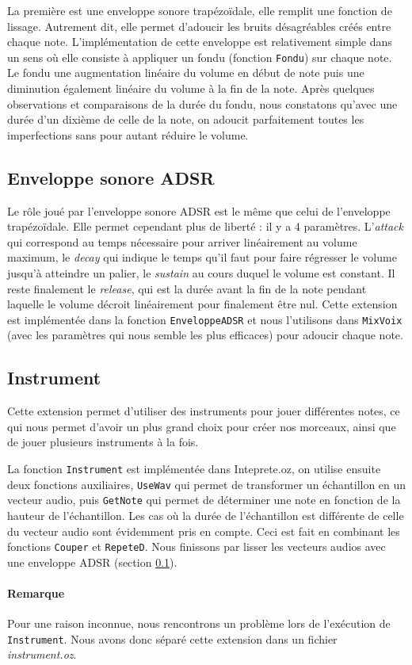 \documentclass[a4paper,oneside,10pt]{article}
\newcommand{\fun}[1]{\texttt{#1}}
\begin{document}
La première est une enveloppe sonore trapézo\"idale, elle remplit une fonction de lissage.
Autrement dit, elle permet d'adoucir les bruits désagréables créés entre chaque note.
L'implémentation de cette enveloppe est relativement simple dans 
un sens où elle consiste à appliquer un fondu (fonction \fun{Fondu}) sur chaque note. 
Le fondu une augmentation linéaire du volume en début de note puis 
une diminution également linéaire du volume à la fin de la note. 
Après quelques observations et comparaisons de la durée du fondu, 
nous constatons qu'avec une durée d'un dixième de celle de la note, 
on adoucit parfaitement toutes les imperfections sans pour autant 
réduire le volume.


\subsection{Enveloppe sonore ADSR}
\label{subsec:adsr}

Le rôle joué par l'enveloppe sonore ADSR est le même que celui de l'enveloppe trapézo\"idale. 
Elle permet cependant plus de liberté : il y a 4 paramètres. 
L'\emph{attack} qui correspond au temps nécessaire pour arriver linéairement 
au volume maximum, le \emph{decay} qui indique le temps qu'il faut pour faire régresser 
le volume jusqu'à atteindre un palier, le \emph{sustain} au cours duquel le volume est constant. 
Il reste finalement le \emph{release}, qui est la durée avant la fin de la note pendant laquelle 
le volume décroit linéairement pour finalement être nul.
Cette extension est implémentée dans la fonction \fun{EnveloppeADSR} 
et nous l'utilisons dans \fun{MixVoix} (avec les paramètres qui nous semble les plus 
efficaces) pour adoucir chaque note.


\subsection{Instrument}

Cette extension permet d'utiliser des instruments pour jouer différentes notes, 
ce qui nous permet d'avoir un plus grand choix pour créer nos morceaux, 
ainsi que de jouer plusieurs instruments à la fois. 

La fonction \fun{Instrument} est implémentée dans Inteprete.oz, 
on utilise ensuite deux fonctions auxiliaires, \fun{UseWav} qui permet 
de transformer un échantillon en un vecteur audio, puis \fun{GetNote} qui permet 
de déterminer une note en fonction de la hauteur de l'échantillon. 
Les cas où la durée de l'échantillon est différente de celle du vecteur audio 
sont évidemment pris en compte.
Ceci est fait en combinant les fonctions \fun{Couper} et \fun{RepeteD}. 
Nous finissons par lisser les vecteurs audios avec une enveloppe ADSR (section \ref{subsec:adsr}).

\paragraph{Remarque}
Pour une raison inconnue, nous rencontrons un problème lors de l'exécution de \fun{Instrument}.
Nous avons donc séparé cette extension dans un fichier \textit{instrument.oz}.
\end{document}
